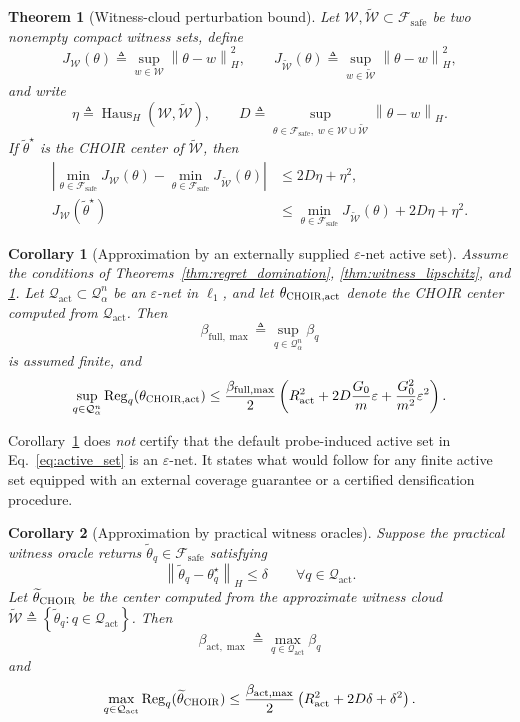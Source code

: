 \documentclass{article}
\newtheorem{theorem}{Theorem}
\newtheorem{corollary}{Corollary}
\newcommand{\cF}{\mathcal{F}}
\newcommand{\cQ}{\mathcal{Q}}
\newcommand{\cW}{\mathcal{W}}
\newcommand{\Reg}{\operatorname{Reg}}
\newcommand{\Haus}{\operatorname{Haus}}
\newcommand{\choir}{\textup{\textsc{CHOIR}}}
\newcommand{\norm}[1]{\left\lVert #1 \right\rVert}
\newcommand{\abs}[1]{\left\lvert #1 \right\rvert}
\newcommand{\paren}[1]{\left( #1 \right)}
\newcommand{\braces}[1]{\left\{ #1 \right\}}
\newcommand{\safe}{\mathrm{safe}}
\newcommand{\act}{\mathrm{act}}
\newcommand{\full}{\mathrm{full}}
\begin{document}
\begin{theorem}[Witness-cloud perturbation bound]
\label{thm:hausdorff}
Let \(\cW,\widetilde{\cW}\subset\cF_{\safe}\) be two nonempty compact witness sets, define
\[
J_{\cW}(\theta)
\triangleq
\sup_{w\in\cW}\norm{\theta-w}_H^2,
\qquad
J_{\widetilde{\cW}}(\theta)
\triangleq
\sup_{w\in\widetilde{\cW}}\norm{\theta-w}_H^2,
\]
and write
\[
\eta \triangleq \Haus_H(\cW,\widetilde{\cW}),
\qquad
D \triangleq
\sup_{\theta\in\cF_{\safe},\; w\in\cW\cup\widetilde{\cW}}
\norm{\theta-w}_H.
\]
If \(\widetilde\theta^\star\) is the \choir{} center of \(\widetilde{\cW}\), then
\begin{align}
\abs{
\min_{\theta\in\cF_{\safe}} J_{\cW}(\theta)
-
\min_{\theta\in\cF_{\safe}} J_{\widetilde{\cW}}(\theta)
}
&\le 2D\eta + \eta^2,
\label{eq:value_perturb}\\
J_{\cW}(\widetilde\theta^\star)
&\le
\min_{\theta\in\cF_{\safe}} J_{\widetilde{\cW}}(\theta) + 2D\eta + \eta^2.
\label{eq:policy_perturb}
\end{align}
\end{theorem}

\begin{corollary}[Approximation by an externally supplied \(\varepsilon\)-net active set]
\label{cor:epsnet}
Assume the conditions of Theorems~\ref{thm:regret_domination}, \ref{thm:witness_lipschitz}, and \ref{thm:hausdorff}. Let \(\cQ_{\act}\subset\cQ_\alpha^n\) be an \(\varepsilon\)-net in \(\ell_1\), and let \(\theta_{\choir,\act}\) denote the \choir{} center computed from \(\cQ_{\act}\). Then
\[
\beta_{\full,\max}
\triangleq
\sup_{q\in\cQ_\alpha^n}\beta_q
\]
is assumed finite, and
\[
\sup_{q\in\cQ_\alpha^n}
\Reg_q(\theta_{\choir,\act})
\le
\frac{\beta_{\full,\max}}{2}
\paren{
R_\act^2 + 2D\frac{G_0}{m}\varepsilon + \frac{G_0^2}{m^2}\varepsilon^2
}.
\]
\end{corollary}

Corollary~\ref{cor:epsnet} does \emph{not} certify that the default probe-induced active set in Eq.~\eqref{eq:active_set} is an \(\varepsilon\)-net. It states what would follow for any finite active set equipped with an external coverage guarantee or a certified densification procedure.

\begin{corollary}[Approximation by practical witness oracles]
\label{cor:oracle}
Suppose the practical witness oracle returns \(\widetilde\theta_q\in\cF_{\safe}\) satisfying
\[
\norm{\widetilde\theta_q-\theta_q^\star}_H \le \delta
\qquad
\forall q\in\cQ_{\act}.
\]
Let \(\widetilde\theta_{\choir}\) be the center computed from the approximate witness cloud \(\widetilde{\cW}\triangleq\braces{\widetilde\theta_q:q\in\cQ_{\act}}\). Then
\[
\beta_{\act,\max}
\triangleq
\max_{q\in\cQ_{\act}}\beta_q
\]
and
\[
\max_{q\in\cQ_{\act}}
\Reg_q(\widetilde\theta_{\choir})
\le
\frac{\beta_{\act,\max}}{2}\paren{R_\act^2 + 2D\delta + \delta^2 }.
\]
\end{corollary}
\end{document}
